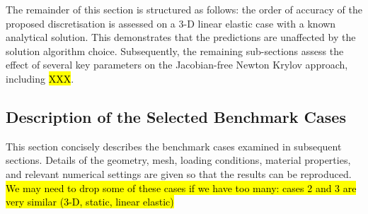 \documentclass[sn-mathphys,Numbered]{sn-jnl}%
\begin{document}
The remainder of this section is structured as follows:
the order of accuracy of the proposed discretisation is assessed on a 3-D linear elastic case with a known analytical solution.
This demonstrates that the predictions are unaffected by the solution algorithm choice.
Subsequently, the remaining sub-sections assess the effect of several key parameters on the Jacobian-free Newton Krylov approach, including \hl{XXX}.


\subsection{Description of the Selected Benchmark Cases}
\label{sec:case_descriptions}


This section concisely describes the benchmark cases examined in subsequent sections.
Details of the geometry, mesh, loading conditions, material properties, and relevant numerical settings are given so that the results can be reproduced.
\hl{We may need to drop some of these cases if we have too many: cases 2 and 3 are very similar (3-D, static, linear elastic)}
 
\end{document}

